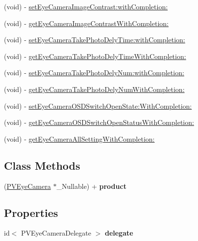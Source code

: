 \begin{DoxyCompactItemize}
\item 
(void) -\/ \hyperlink{interface_p_v_eye_camera_a7773d15d09dfb8b7c85a8677034e3a7b}{set\+Eye\+Camera\+Image\+Contrast\+:with\+Completion\+:}
\item 
(void) -\/ \hyperlink{interface_p_v_eye_camera_acc2edf3de4a5da9809fc72c88004d612}{get\+Eye\+Camera\+Image\+Contrast\+With\+Completion\+:}
\item 
(void) -\/ \hyperlink{interface_p_v_eye_camera_abdc54101661d7172481a7f70e67dd3c2}{set\+Eye\+Camera\+Take\+Photo\+Dely\+Time\+:with\+Completion\+:}
\item 
(void) -\/ \hyperlink{interface_p_v_eye_camera_a97e7027e7ec343e628c7947301cb5679}{get\+Eye\+Camera\+Take\+Photo\+Dely\+Time\+With\+Completion\+:}
\item 
(void) -\/ \hyperlink{interface_p_v_eye_camera_a3d11be57856ff0bf589aae8ba1385b9b}{set\+Eye\+Camera\+Take\+Photo\+Dely\+Num\+:with\+Completion\+:}
\item 
(void) -\/ \hyperlink{interface_p_v_eye_camera_a003a47e3f9642333ad2412399d66db51}{get\+Eye\+Camera\+Take\+Photo\+Dely\+Num\+With\+Completion\+:}
\item 
(void) -\/ \hyperlink{interface_p_v_eye_camera_a8bd31021966adc98ebec45dcac0df252}{set\+Eye\+Camera\+O\+S\+D\+Switch\+Open\+State\+:\+With\+Completion\+:}
\item 
(void) -\/ \hyperlink{interface_p_v_eye_camera_a404f92a7e5fbd7b9424e23743a5f7777}{get\+Eye\+Camera\+O\+S\+D\+Switch\+Open\+Status\+With\+Completion\+:}
\item 
(void) -\/ \hyperlink{interface_p_v_eye_camera_a7f8c1c24d5ca1e1a41a0bc19299a3c78}{get\+Eye\+Camera\+All\+Setting\+With\+Completion\+:}
\end{DoxyCompactItemize}
\subsection*{Class Methods}
\begin{DoxyCompactItemize}
\item 
\mbox{\label{interface_p_v_eye_camera_a4e0645c70a8b0e631c5971c0ec9eb99d}} 
(\hyperlink{interface_p_v_eye_camera}{P\+V\+Eye\+Camera} $\ast$\+\_\+\+Nullable) + {\bfseries product}
\end{DoxyCompactItemize}
\subsection*{Properties}
\begin{DoxyCompactItemize}
\item 
\mbox{\label{interface_p_v_eye_camera_ad2f7edabf64d3e37448d181a3b28d4f6}} 
id$<$ P\+V\+Eye\+Camera\+Delegate $>$ {\bfseries delegate}
\end{DoxyCompactItemize}


